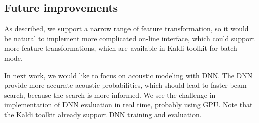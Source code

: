 
\subsection{Future improvements}
\label{sub:onl_future}
As described, we support a narrow range of feature transformation,
so it would be natural to implement more complicated on-line interface,
which could support more feature transformations, 
which are available in Kaldi toolkit for batch mode. 

In next work, we would like to focus on acoustic modeling with \acl{DNN}.
The \ac{DNN} provide more accurate acoustic probabilities, 
which should lead to faster beam search,
because the search is more informed.\cite{TODO_DNN} 
We see the challenge in implementation of \acl{DNN} evaluation in real time, probably using \ac{GPU}.
Note that the Kaldi toolkit already support \ac{DNN} training and evaluation.
